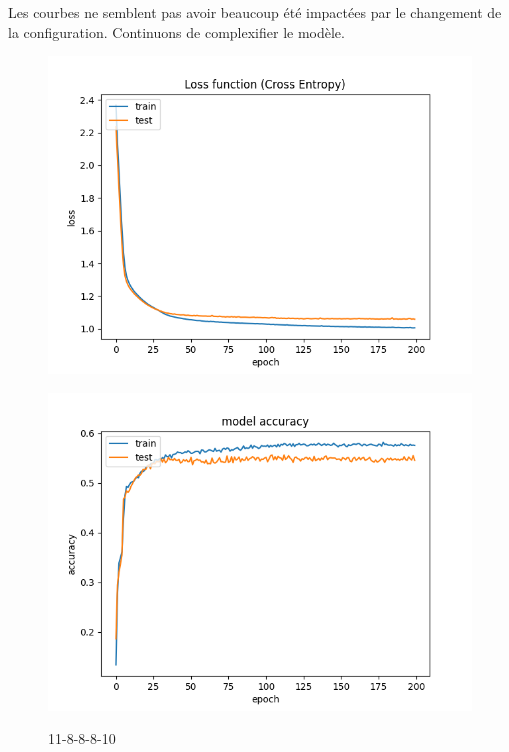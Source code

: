 \newpage

Les courbes ne semblent pas avoir beaucoup été impactées par le changement de la configuration. Continuons de complexifier le modèle.

\vspace{1cm}

\begin{figure}[!htb]
    \begin{minipage}{0.5\textwidth}
        \centering
        \includegraphics[width=1\textwidth]{../images/11-8-8-8/Loss function(Cross entropy).png}
        \label{fig:11-8-8-8-10}
    \end{minipage}\hfill
    \begin{minipage}{0.5\textwidth}
        \centering
        \includegraphics[width=1\textwidth]{../images/11-8-8-8/model accuracy(Cross entropy).png}
        \label{fig:11-8-8-8-10.2}
    \end{minipage}
    \caption{11-8-8-8-10}
\end{figure}

